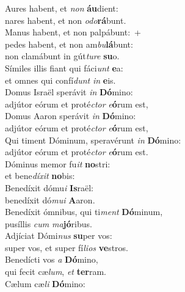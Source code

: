 \evenverse Aures habent, et \textit{non} \textbf{áu}dient:~\*\\
\evenverse nares habent, et non \textit{o}\textit{do}\textbf{rá}bunt.\\
\oddverse Manus habent, et non palpábunt:~+\\
\oddverse  pedes habent, et non am\textit{bu}\textbf{lá}bunt:~\*\\
\oddverse non clamábunt in gút\textit{tu}\textit{re} \textbf{su}o.\\
\evenverse Símiles illis fiant qui fáci\textit{unt} \textbf{e}a:~\*\\
\evenverse et omnes qui confí\textit{dunt} \textit{in} \textbf{e}is.\\
\oddverse Domus Israël sperávit \textit{in} \textbf{Dó}mino:~\*\\
\oddverse adjútor eórum et proté\textit{ctor} \textit{e}\textbf{ó}rum est,\\
\evenverse Domus Aaron sperávit \textit{in} \textbf{Dó}mino:~\*\\
\evenverse adjútor eórum et proté\textit{ctor} \textit{e}\textbf{ó}rum est,\\
\oddverse Qui timent Dóminum, speravérunt \textit{in} \textbf{Dó}mino:~\*\\
\oddverse adjútor eórum et proté\textit{ctor} \textit{e}\textbf{ó}rum est.\\
\evenverse Dóminus memor fu\textit{it} \textbf{no}stri:~\*\\
\evenverse et bene\textit{dí}\textit{xit} \textbf{no}bis:\\
\oddverse Benedíxit dómu\textit{i} \textbf{Is}raël:~\*\\
\oddverse benedíxit dó\textit{mu}\textit{i} \textbf{A}aron.\\
\evenverse Benedíxit ómnibus, qui ti\textit{ment} \textbf{Dó}minum,~\*\\
\evenverse pusíllis \textit{cum} \textit{ma}\textbf{jó}ribus.\\
\oddverse Adjíciat Dómi\textit{nus} \textbf{su}per vos:~\*\\
\oddverse super vos, et super fí\textit{li}\textit{os} \textbf{ve}stros.\\
\evenverse Benedícti vos \textit{a} \textbf{Dó}mino,~\*\\
\evenverse qui fecit cæ\textit{lum}, \textit{et} \textbf{ter}ram.\\
\oddverse Cælum cæ\textit{li} \textbf{Dó}mino:~\*\\
